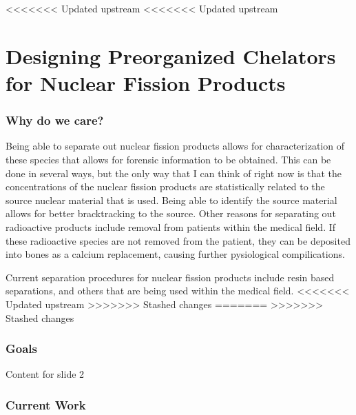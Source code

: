 <<<<<<< Updated upstream
<<<<<<< Updated upstream
\section{Designing Preorganized Chelators for Nuclear Fission Products}


\begin{frame}
\frametitle{Why do we care?}
Being able to separate out nuclear fission products allows for characterization of these species that allows for forensic information to be obtained. This can be done in several ways, but the only way that I can think of right now is
that the concentrations of the nuclear fission products are statistically related to the source nuclear material that is used. Being able to identify the source material allows for better bracktracking to the source. Other reasons for
separating out radioactive products include removal from patients within the medical field. If these radioactive species are not removed from the patient, they can be deposited into bones as a calcium replacement, causing further
pysiological compilications. 
\end{frame}

\begin{frame}
Current separation procedures for nuclear fission products include resin based separations, and others that are being used within the medical field. 
<<<<<<< Updated upstream
>>>>>>> Stashed changes
=======
>>>>>>> Stashed changes
\end{frame}


\begin{frame}
\frametitle{Goals}
Content for slide 2
\end{frame}


\begin{frame}
\frametitle{Current Work}
\end{frame}

